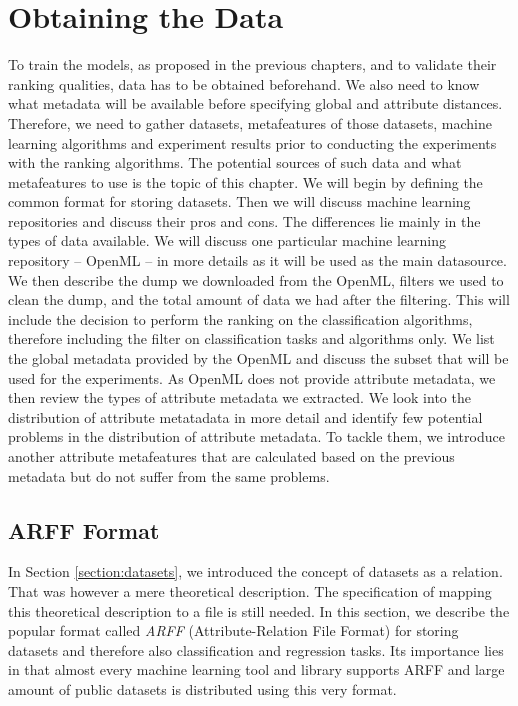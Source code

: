 \chapter{Obtaining the Data}
\label{chapter:obtainingData}
To train the models, as proposed in the previous chapters, and to validate their ranking qualities, data has to be obtained beforehand. We also need to know what metadata will be available before specifying global and attribute distances. Therefore, we need to gather datasets, metafeatures of those datasets, machine learning algorithms and experiment results prior to conducting the experiments with the ranking algorithms. The potential sources of such data and what metafeatures to use is the topic of this chapter. We will begin by defining the common format for storing datasets. Then we will discuss machine learning repositories and discuss their pros and cons. The differences lie mainly in the types of data available. We will discuss one particular machine learning repository -- OpenML -- in more details as it will be used as the main datasource. We then describe the dump we downloaded from the OpenML, filters we used to clean the dump, and the total amount of data we had after the filtering. This will include the decision to perform the ranking on the classification algorithms, therefore including the filter on classification tasks and algorithms only. We list the global metadata provided by the OpenML and discuss the subset that will be used for the experiments. As OpenML does not provide attribute metadata, we then review the types of attribute metadata we extracted. We look into the distribution of attribute metatadata in more detail and identify few potential problems in the distribution of attribute metadata. To tackle them, we introduce another attribute metafeatures that are calculated based on the previous metadata but do not suffer from the same problems.

\section{ARFF Format}
\label{section:arff}
In Section \ref{section:datasets}, we introduced the concept of datasets as a relation. That was however a mere theoretical description. The specification of mapping this theoretical description to a file is still needed. In this section, we describe the popular format called \emph{ARFF} (Attribute-Relation File Format) for storing datasets and therefore also classification and regression tasks. Its importance lies in that almost every machine learning tool and library supports ARFF and large amount of public datasets is distributed using this very format.

